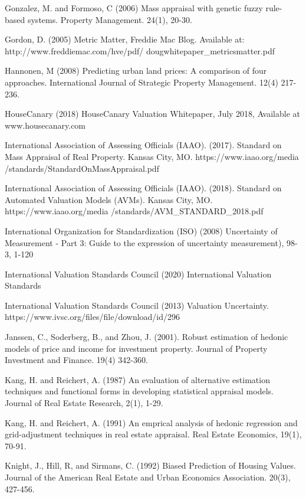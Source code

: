 \documentclass[colTwo]{anon}
\theoremstyle{definition}
\begin{document}
\begin{thebibliography}{50}
\harvarditem{}{}{}Gonzalez, M. and Formoso, C (2006) Mass appraisal with genetic fuzzy rule-based systems. Property Management. 24(1), 20-30. 

\harvarditem{}{}{}Gordon, D. (2005) Metric Matter, Freddie Mac Blog. Available at: http://www.freddiemac.com/hve/pdf/ dougwhitepaper\_metricsmatter.pdf

\harvarditem{}{}{}Hannonen, M (2008) Predicting urban land prices: A comparison of four approaches. International Journal of Strategic Property Management. 12(4) 217-236. 

\harvarditem{}{}{}HouseCanary (2018) HouseCanary Valuation Whitepaper, July 2018, Available at www.housecanary.com

\harvarditem{}{}{}International Association of Assessing Officials (IAAO). (2017). Standard on Mass Appraisal of Real Property. Kansas City, MO. https://www.iaao.org/media /standards/StandardOnMassAppraisal.pdf

\harvarditem{}{}{}International Association of Assessing Officials (IAAO). (2018). Standard on Automated Valuation Models (AVMs). Kansas City, MO. https://www.iaao.org/media /standards/AVM\_STANDARD\_2018.pdf

\harvarditem{}{}{} International Organization for Standardization (ISO) (2008) Uncertainty of Measurement - Part 3: Guide to the expression of uncertainty measurement), 98-3, 1-120

\harvarditem{}{}{}International Valuation Standards Council (2020) International Valuation Standards 

\harvarditem{}{}{}International Valuation Standards Council (2013) Valuation Uncertainty. https://www.ivsc.org/files/file/download/id/296

\harvarditem{}{}{}Janssen, C., Soderberg, B., and Zhou, J. (2001). Robust estimation of hedonic models of price and income for investment property. Journal of Property Investment and Finance. 19(4) 342-360. 

\harvarditem{}{}{}Kang, H. and Reichert, A. (1987) An evaluation of alternative estimation techniques and functional forms in developing statistical appraisal models. Journal of Real Estate Research, 2(1), 1-29. 

\harvarditem{}{}{}Kang, H. and Reichert, A. (1991) An emprical analysis of hedonic regression and grid-adjustment techniques in real estate appraisal. Real Estate Economics, 19(1), 70-91. 

\harvarditem{}{}{}Knight, J., Hill, R, and Sirmans, C. (1992) Biased Prediction of Housing Values. Journal of the American Real Estate and Urban Economics Association. 20(3), 427-456. 


\end{thebibliography}
\end{document}
